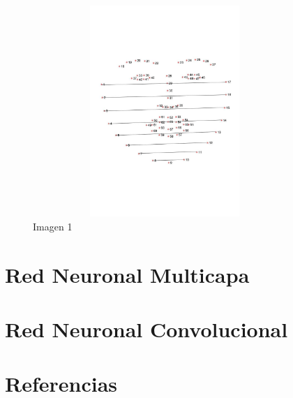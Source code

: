 \documentclass{article}
\begin{document}
\begin{figure}[H]
  \centering
  \includegraphics[width=100mm, height=80mm]{images/width_distances.jpg}
  \caption{Imagen 1}
\end{figure}

\section{Red Neuronal Multicapa}

\section{Red Neuronal Convolucional}

\section{Referencias}
\end{document}
